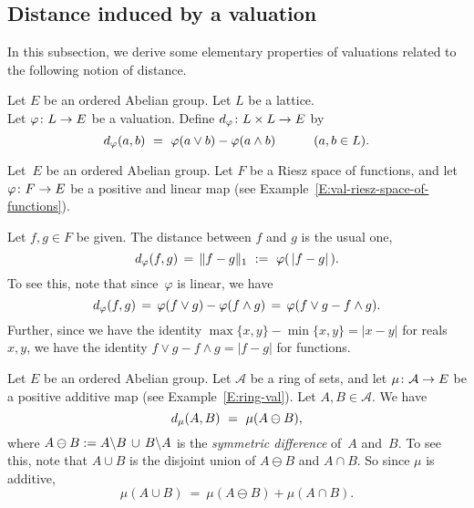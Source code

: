 \documentclass[main.tex]{subfiles}
\begin{document}
\subsection{Distance induced by a valuation}
In this subsection,
we derive some elementary properties of
valuations related to the following notion
of distance.
\begin{dfn}
\label{D:d}
Let $E$ be an ordered Abelian group.
Let $L$ be a lattice.\\
Let $\varphi\colon L \rightarrow E$ be a valuation.
Define $d_{\smash{\varphi}}\colon L\times L \rightarrow E$ by
\begin{equation*}
\ld\varphi(a,b)\ =\  \varphi(a\vee b) - \varphi(a \wedge b)
\qquad\quad(a,b\in L).
\end{equation*}
\end{dfn}
%
%
\begin{ex}
\label{E:d-riesz}
Let~$E$ be an ordered Abelian group.
Let $F$ be a Riesz space of functions,
and let $\varphi\colon F\rightarrow E$ be
a positive and linear map
(see Example~\ref{E:val-riesz-space-of-functions}).

Let $f,g\in F$ be given.
The distance between $f$ and $g$ is the usual one,
\begin{equation*}
d_{\smash{\varphi}}(f,g) \,=\, \|f-g\|_1 \ :=\ \varphi(\,|f-g|\,).
\end{equation*}
To see this,
note that since~$\varphi$ is linear,
we have 
\begin{equation*}
d_{\smash{\varphi}}(f,g) \,=\, 
\varphi(f\vee g) - \varphi(f\wedge g)
\,=\, \varphi(f\vee g - f\wedge g).
\end{equation*}
Further,
since we have the identity $\max\{x,y\} - \min\{x,y\} = |x-y|$
for reals $x,y$,
we have the identity $f\vee g - f\wedge g = |f-g|$
for functions.
\end{ex}
\begin{ex}
Let $E$ be an ordered Abelian group.
Let $\mathcal{A}$ be a ring of sets,
and let $\mu\colon \mathcal{A}\rightarrow E$
be a positive additive map
(see Example~\ref{E:ring-val}).
Let $A,B\in\mathcal{A}$.
We have
\begin{equation*}
d_{\smash{\mu}}(A,B) \ =\ \mu(A \ominus B),
\end{equation*}
where $A\ominus B := A\backslash B \,\cup\, B\backslash A$
is the \emph{symmetric difference} of~$A$ and~$B$.
To see this, note that $A\cup B$ is the disjoint union
of $A\ominus B$ and $A\cap B$. So
since $\mu$ is additive, 
\begin{equation*}
\mu(A\cup B) \ =\ \mu(A\ominus B) + \mu(A\cap B).
\end{equation*}
\end{ex}
\end{document}
